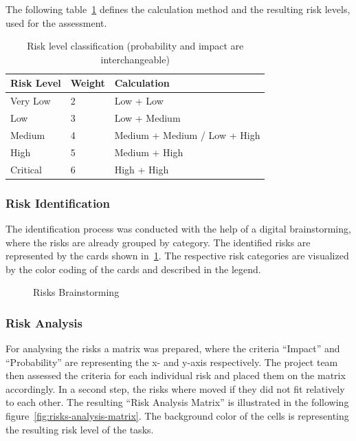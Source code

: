 The following table~\ref{tab:risk-level} defines the calculation method and the resulting risk levels, used for the assessment.

\begin{table}[h]
    \begin{tabularx}{\textwidth}{llX}
        \toprule
        \textbf{Risk Level} & \textbf{Weight} & \textbf{Calculation} \\
        \midrule
        Very Low & 2 & Low + Low \\
        Low & 3 & Low + Medium \\
        Medium & 4 & Medium + Medium / Low + High \\
        High & 5 & Medium + High \\
        Critical & 6 & High + High \\
        \bottomrule
    \end{tabularx}
    \caption{Risk level classification (probability and impact are interchangeable)}\label{tab:risk-level}
\end{table}

\subsubsection{Risk Identification}\label{subsubsec:risk_identification}

The identification process was conducted with the help of a digital brainstorming, where the risks are already grouped by category.
The identified risks are represented by the cards shown in~\ref{fig:risks-brainstorming}.
The respective risk categories are visualized by the color coding of the cards and described in the legend.

\begin{figure}[H]
    \centering
    
    \caption{Risks Brainstorming}
    \label{fig:risks-brainstorming}
\end{figure}



\subsubsection{Risk Analysis}\label{subsubsec:risk_analysis}

For analysing the risks a matrix was prepared, where the criteria \enquote{Impact} and \enquote{Probability} are representing the x- and y-axis respectively.
The project team then assessed the criteria for each individual risk and placed them on the matrix accordingly.
In a second step, the risks where moved if they did not fit relatively to each other.
The resulting \enquote{Risk Analysis Matrix} is illustrated in the following figure~\ref{fig:risks-analysis-matrix}.
The background color of the cells is representing the resulting risk level of the tasks.

